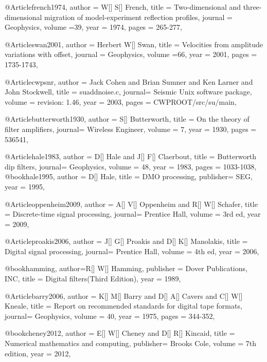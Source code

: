 {@Article{french1974,
  author = 	 {W[] S[] French},
  title = 	 {Two-dimensional and three-dimensional migration of model-experiment reflection profiles},
  journal = 	 {Geophysics},
  volume ={39},
  year = 	 1974,
  pages =	 {265-277},
}

@Article{swan2001,
  author = 	 {Herbert W[] Swan},
  title = 	 {Velocities from amplitude variations with offset},
  journal = 	 {Geophysics},
  volume ={66},
  year = 	 2001,
  pages =	 {1735-1743},
}

@Article{cwpsnr,
  author = 	 {Jack Cohen and Brian Sumner and Ken Larner and John Stockwell},
  title  = 	 {suaddnoise.c},
  journal= 	 {Seismic Unix software package},
  volume =	 {revision: 1.46},
  year   = 	 2003,
  pages  =	 {CWPROOT/src/su/main},
}

@Article{butterworth1930,
  author = 	 {S[] Butterworth},
  title  = 	 {On the theory of filter amplifiers},
  journal= 	 {Wireless Engineer},
  volume =	 {7},
  year   = 	 1930,
  pages  =	 {536541},
}

@Article{hale1983,
  author = 	 {D[] Hale and J[] F[] Claerbout},
  title  = 	 {Butterworth dip filters},
  journal= 	 {Geophysics},
  volume =	 {48},
  year   = 	 1983,
  pages  =	 {1033-1038},
}
@book{hale1995,
  author = 	 {D[] Hale},
  title  = 	 {DMO processing},
  publisher= 	 {SEG},
  year   = 	 1995,
}

@Article{oppenheim2009,
  author = 	 {A[] V[] Oppenheim and R[] W[] Schafer},
  title  = 	 {Discrete-time signal processing},
  journal= 	 {Prentice Hall},
  volume =	 {3rd ed},
  year   = 	 2009,
}

@Article{proakis2006,
  author = 	 {J[] G[] Proakis and D[] K[] Manolakis},
  title  = 	 {Digital signal processing},
  journal= 	 {Prentice Hall},
  volume =	 {4th ed},
  year   = 	 2006,
}

@book{hamming,
  author={R[] W[] Hamming},
  publisher = {Dover Publications, INC},
  title = {Digital filters(Third Edition)},
  year = {1989},
}

@Article{barry2006,
  author = 	 {K[] M[] Barry and D[] A[] Cavers and C[] W[] Kneale},
  title  = 	 {Report on recommended standards for digital tape formats},
  journal= 	 {Geophysics},
  volume =	 {40},
  year   = 	 1975,
  pages  = 	 344-352,
}

@book{cheney2012,
  author = 	 {E[] W[] Cheney and D[] R[] Kincaid},
  title  = 	 {Numerical mathematics and computing},
  publisher= 	 {Brooks Cole},
  volume =	 {7th edition},
  year   = 	 2012,
}

}

